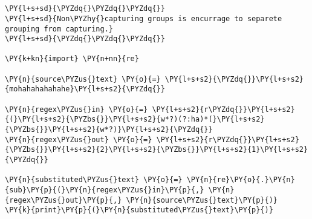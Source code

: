 

\section*{}

\begin{Verbatim}[commandchars=\\\{\}]
\PY{l+s+sd}{\PYZdq{}\PYZdq{}\PYZdq{}}
\PY{l+s+sd}{Non\PYZhy{}capturing groups is encurrage to separete grouping from capturing.}
\PY{l+s+sd}{\PYZdq{}\PYZdq{}\PYZdq{}}

\PY{k+kn}{import} \PY{n+nn}{re}

\PY{n}{source\PYZus{}text} \PY{o}{=} \PY{l+s+s2}{\PYZdq{}}\PY{l+s+s2}{mohahahahahahe}\PY{l+s+s2}{\PYZdq{}}

\PY{n}{regex\PYZus{}in} \PY{o}{=} \PY{l+s+s2}{r\PYZdq{}}\PY{l+s+s2}{(}\PY{l+s+s2}{\PYZbs{}}\PY{l+s+s2}{w*?)(?:ha)*(}\PY{l+s+s2}{\PYZbs{}}\PY{l+s+s2}{w*?)}\PY{l+s+s2}{\PYZdq{}}
\PY{n}{regex\PYZus{}out} \PY{o}{=} \PY{l+s+s2}{r\PYZdq{}}\PY{l+s+s2}{\PYZbs{}}\PY{l+s+s2}{2}\PY{l+s+s2}{\PYZbs{}}\PY{l+s+s2}{1}\PY{l+s+s2}{\PYZdq{}}

\PY{n}{substituted\PYZus{}text} \PY{o}{=} \PY{n}{re}\PY{o}{.}\PY{n}{sub}\PY{p}{(}\PY{n}{regex\PYZus{}in}\PY{p}{,} \PY{n}{regex\PYZus{}out}\PY{p}{,} \PY{n}{source\PYZus{}text}\PY{p}{)}
\PY{k}{print}\PY{p}{(}\PY{n}{substituted\PYZus{}text}\PY{p}{)}
\end{Verbatim}

